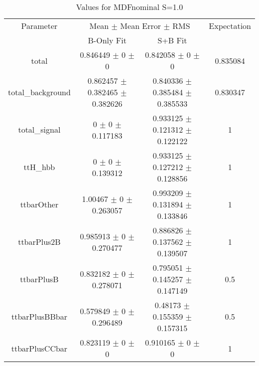 \begin{table}
\centering
\caption{Values for MDFnominal S=1.0}
\begin{tabular}{cccc}
\toprule
Parameter & \multicolumn{2}{c}{Mean $\pm$ Mean Error $\pm$ RMS} & Expectation\\
 & B-Only Fit & S+B Fit & \\
\midrule
total & \num{0.846449} $\pm$ \num{0} $\pm$ \num{0} & \num{0.842058} $\pm$ \num{0} $\pm$ \num{0} & \num{0.835084}\\
total\_background & \num{0.862457} $\pm$ \num{0.382465} $\pm$ \num{0.382626} & \num{0.840336} $\pm$ \num{0.385484} $\pm$ \num{0.385533} & \num{0.830347}\\
total\_signal & \num{0} $\pm$ \num{0} $\pm$ \num{0.117183} & \num{0.933125} $\pm$ \num{0.121312} $\pm$ \num{0.122122} & \num{1}\\
ttH\_hbb & \num{0} $\pm$ \num{0} $\pm$ \num{0.139312} & \num{0.933125} $\pm$ \num{0.127212} $\pm$ \num{0.128856} & \num{1}\\
ttbarOther & \num{1.00467} $\pm$ \num{0} $\pm$ \num{0.263057} & \num{0.993209} $\pm$ \num{0.131894} $\pm$ \num{0.133846} & \num{1}\\
ttbarPlus2B & \num{0.985913} $\pm$ \num{0} $\pm$ \num{0.270477} & \num{0.886826} $\pm$ \num{0.137562} $\pm$ \num{0.139507} & \num{1}\\
ttbarPlusB & \num{0.832182} $\pm$ \num{0} $\pm$ \num{0.278071} & \num{0.795051} $\pm$ \num{0.145257} $\pm$ \num{0.147149} & \num{0.5}\\
ttbarPlusBBbar & \num{0.579849} $\pm$ \num{0} $\pm$ \num{0.296489} & \num{0.48173} $\pm$ \num{0.155359} $\pm$ \num{0.157315} & \num{0.5}\\
ttbarPlusCCbar & \num{0.823119} $\pm$ \num{0} $\pm$ \num{0} & \num{0.910165} $\pm$ \num{0} $\pm$ \num{0} & \num{1}\\
\bottomrule
\end{tabular}
\end{table}